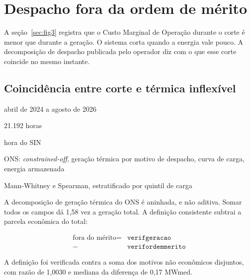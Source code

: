 \chapter{Despacho fora da ordem de mérito}
\label{cap:despacho}

A seção~\ref{sec:fig3} registra que o Custo Marginal de Operação durante o corte
é menor que durante a geração. O sistema corta quando a energia vale pouco. A
decomposição de despacho publicada pelo operador diz com o que esse corte
coincide no mesmo instante.

\section{Coincidência entre corte e térmica inflexível}
\label{sec:fig8}

\begin{ficha}
  \item[Janela]      abril de 2024 a agosto de 2026
  \item[Amostra]     21.192 horas
  \item[Unidade]     hora do SIN
  \item[Fonte]       ONS: \textit{constrained-off}, geração térmica por motivo
                     de despacho, curva de carga, energia armazenada
  \item[Teste]       Mann-Whitney e Spearman, estratificado por quintil de carga
\end{ficha}

A decomposição de geração térmica do ONS é aninhada, e não aditiva. Somar todos
os campos dá 1,58 vez a geração total. A definição consistente subtrai a parcela
econômica do total:

\begin{equation*}
\begin{aligned}
\text{fora do mérito} = {} & \texttt{verifgeracao} \\
                          {}-{} & \texttt{verifordemmerito}
\end{aligned}
\end{equation*}

A definição foi verificada contra a soma dos motivos não econômicos disjuntos,
com razão de 1,0030 e mediana da diferença de 0,17 MWmed.


